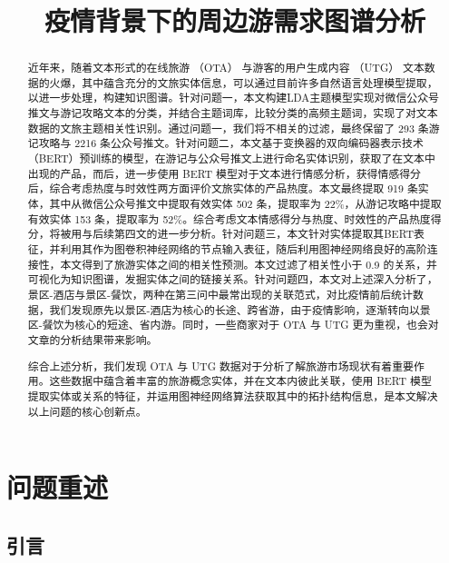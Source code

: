 \documentclass[bwprint]{gmcmthesis}
\title{疫情背景下的周边游需求图谱分析}
\begin{document}
 \maketitle

\begin{abstract}
近年来，随着文本形式的在线旅游 （OTA） 与游客的用户生成内容 （UTG） 文本数据的火爆，其中蕴含充分的文旅实体信息，可以通过目前许多自然语言处理模型提取，以进一步处理，构建知识图谱。针对问题一，本文构建LDA主题模型实现对微信公众号推文与游记攻略文本的分类，并结合主题词库，比较分类的高频主题词，实现了对文本数据的文旅主题相关性识别。通过问题一，我们将不相关的过滤，最终保留了 293 条游记攻略与 2216 条公众号推文。针对问题二，本文基于变换器的双向编码器表示技术（BERT）预训练的模型，在游记与公众号推文上进行命名实体识别，获取了在文本中出现的产品，而后，进一步使用 BERT 模型对于文本进行情感分析，获得情感得分后，综合考虑热度与时效性两方面评价文旅实体的产品热度。本文最终提取 919 条实体，其中从微信公众号推文中提取有效实体 502 条，提取率为 22\%，从游记攻略中提取有效实体 153 条，提取率为 52\%。综合考虑文本情感得分与热度、时效性的产品热度得分，将被用与后续第四文的进一步分析。针对问题三，本文针对实体提取其BERT表征，并利用其作为图卷积神经网络的节点输入表征，随后利用图神经网络良好的高阶连接性，本文得到了旅游实体之间的相关性预测。本文过滤了相关性小于 0.9 的关系，并可视化为知识图谱，发掘实体之间的链接关系。针对问题四，本文对上述深入分析了，景区-酒店与景区-餐饮，两种在第三问中最常出现的关联范式，对比疫情前后统计数据，我们发现原先以景区-酒店为核心的长途、跨省游，由于疫情影响，逐渐转向以景区-餐饮为核心的短途、省内游。同时，一些商家对于 OTA 与 UTG 更为重视，也会对文章的分析结果带来影响。

综合上述分析，我们发现 OTA 与 UTG 数据对于分析了解旅游市场现状有着重要作用。这些数据中蕴含着丰富的旅游概念实体，并在文本内彼此关联，使用 BERT 模型提取实体或关系的特征，并运用图神经网络算法获取其中的拓扑结构信息，是本文解决以上问题的核心创新点。


\end{abstract}

\pagestyle{plain}


\section{问题重述}

\subsection{引言}
\end{document}
